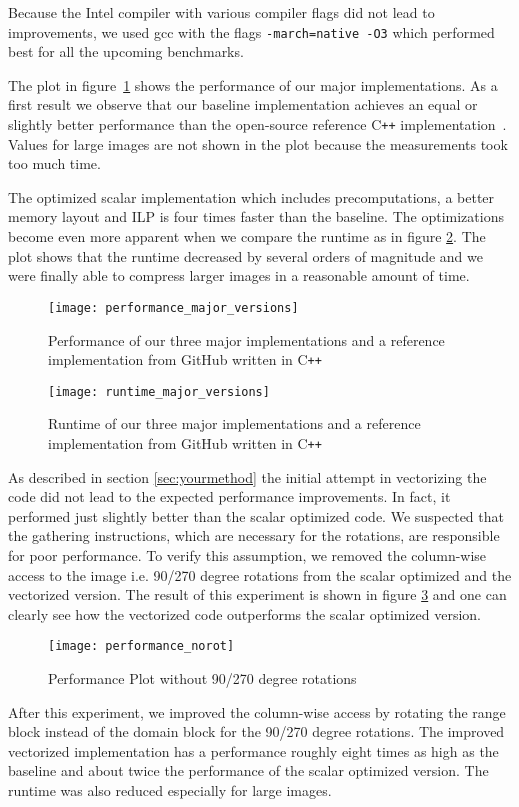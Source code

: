 Because the Intel compiler with various compiler flags did not lead to
improvements, we used gcc with the flags \texttt{-march=native -O3} which
performed best for all the upcoming benchmarks.

 The plot in figure~\ref{fig:perf} shows the performance of
our major implementations. As a first result we observe that our baseline
implementation achieves an equal or slightly better performance than the
open-source reference C\texttt{++} implementation~\cite{github-cpp}. Values for
large images are not shown in the plot because the measurements took too much
time.

The optimized scalar implementation which includes precomputations, a better
memory layout and ILP is four times faster than the baseline. The optimizations
become even more apparent when we compare the runtime as in figure
\ref{fig:runtime}. The plot shows that the runtime decreased by several orders
of magnitude and we were finally able to compress larger images in a reasonable
amount of time.

\begin{figure}[H]
  \centering
  \texttt{[image: performance\_major\_versions]}
  \caption{Performance of our three major implementations and a reference
    implementation from GitHub written in C\texttt{++}}
  \label{fig:perf}
\end{figure}


\begin{figure}[H]
  \centering
  \texttt{[image: runtime\_major\_versions]}
  \caption{Runtime of our three major implementations and a reference
    implementation from GitHub written in C\texttt{++}}
  \label{fig:runtime}
\end{figure}

As described in section \ref{sec:yourmethod} the initial attempt in vectorizing
the code did not lead to the expected performance improvements. In fact, it
performed just slightly better than the scalar optimized code. We suspected that
the gathering instructions, which are necessary for the rotations, are
responsible for poor performance. To verify this assumption, we removed the
column-wise access to the image i.e. 90/270 degree rotations from the scalar
optimized and the vectorized version. The result of this experiment is shown in
figure \ref{fig:perf_40_41} and one can clearly see how the vectorized code
outperforms the scalar optimized version.

\begin{figure}[H]
  \centering
  \texttt{[image: performance\_norot]}
  \caption{Performance Plot without 90/270 degree rotations}
  \label{fig:perf_40_41}
\end{figure}


After this experiment, we improved the column-wise access by rotating the range
block instead of the domain block for the 90/270 degree rotations. The improved
vectorized implementation has a performance roughly eight times as high as the
baseline and about twice the performance of the scalar optimized version. The
runtime was also reduced especially for large images.

